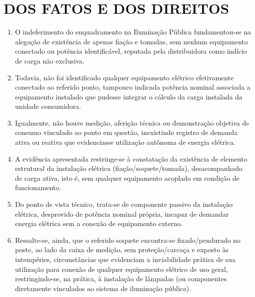 \newcommand{\tipoRequerimento}{Cobrança indevida sobre enquadramento tarifário incorreto}
\section{DOS FATOS E DOS DIREITOS}


\begin{enumerate}[resume]
    \item O indeferimento do enquadramento na Iluminação Pública fundamentou-se na alegação de existência de apenas fiação e tomadas, sem nenhum equipamento conectado ou potência identificável, reputada pela distribuidora como indício de carga não exclusiva.

    \item Todavia, não foi identificado qualquer equipamento elétrico efetivamente conectado ao referido ponto, tampouco indicada potência nominal associada a equipamento instalado que pudesse integrar o cálculo da carga instalada da unidade consumidora.

    \item Igualmente, não houve medição, aferição técnica ou demonstração objetiva de consumo vinculado ao ponto em questão, inexistindo registro de demanda ativa ou reativa que evidenciasse utilização autônoma de energia elétrica.

    \item A evidência apresentada restringe-se à constatação da existência de elemento estrutural da instalação elétrica (fiação/soquete/tomada), desacompanhado de carga ativa, isto é, sem qualquer equipamento acoplado em condição de funcionamento.

    \item Do ponto de vista técnico, trata-se de componente passivo da instalação elétrica, desprovido de potência nominal própria, incapaz de demandar energia elétrica sem a conexão de equipamento externo.

    \item Ressalte-se, ainda, que o referido soquete encontra-se fixado/pendurado no poste, ao lado da caixa de medição, sem proteção/carcaça e exposto às intempéries, circunstâncias que evidenciam a inviabilidade prática de sua utilização para conexão de qualquer equipamento elétrico de uso geral, restringindo-se, na prática, à instalação de lâmpadas (ou componentes diretamente vinculados ao sistema de iluminação pública).

\end{enumerate}

